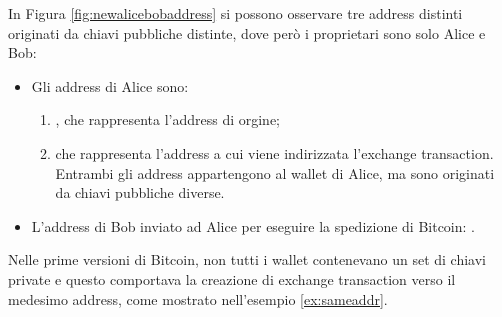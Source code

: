 \begin{example}
    In Figura \ref{fig:newalicebobaddress} si possono osservare tre address distinti originati da chiavi pubbliche distinte, dove però i proprietari sono solo Alice e Bob:
    \begin{itemize}
      \item Gli address di Alice sono:
      \begin{enumerate}
      \item {}, che rappresenta l’address di orgine;

      \item {} che rappresenta l’address a cui viene indirizzata l’exchange transaction. Entrambi gli address appartengono al wallet di Alice, ma sono originati da chiavi pubbliche diverse.
      \end{enumerate}
      \item L’address di Bob inviato ad Alice per eseguire la spedizione di Bitcoin: .
    \end{itemize}
  \end{example}

Nelle prime versioni di Bitcoin, non tutti i wallet contenevano un set di chiavi private e questo comportava la creazione di exchange transaction verso il medesimo address, come mostrato nell'esempio \ref{ex:sameaddr}.


